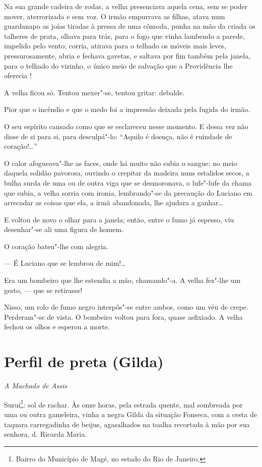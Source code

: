 Na sua grande cadeira de rodas, a velha presenciava aquela cena, sem se
poder mover, aterrorizada e sem voz. O irmão empurrava as filhas, atava
num guardanapo as joias tiradas à pressa de uma cômoda, punha na mão da
criada os talheres de prata, olhava para trás, para o fogo que vinha
lambendo a parede, impelido pelo vento; corria, atirava para o telhado
os móveis mais leves, pressurosamente, abria e fechava gavetas, e
saltava por fim também pela janela, para o telhado do vizinho, o único
meio de salvação que a Providência lhe oferecia !

A velha ficou só. Tentou mexer"-se, tentou gritar: debalde.

Pior que o incêndio e que o medo foi a impressão deixada pela fugida do
irmão.

O seu espírito cansado como que se esclareceu nesse momento. E dessa vez
não disse de si para si, para desculpá"-lo: ``Aquilo é doença, não é
ruindade de coração!\ldots{}''

O calor afogueava"-lhe as faces, onde há muito não subia o sangue; no
meio daquela solidão pavorosa, ouvindo o crepitar da madeira nuns
estalidos secos, a bulha surda de uma ou de outra viga que se
desmoronava, o lufe"-lufe da chama que subia, a velha sorria com ironia,
lembrando"-se da precaução do Luciano em arrecadar as coisas que ela, a
irmã abandonada, lhe ajudara a ganhar\ldots{}

E voltou de novo o olhar para a janela; então, entre o fumo já espesso,
viu desenhar"-se ali uma figura de homem.

O coração bateu"-lhe com alegria.

--- É Luciano que se lembrou de mim!\ldots{}

Era um bombeiro que lhe estendia a mão, chamando"-a. A velha fez"-lhe um
gesto, --- que se retirasse!

Nisso, um rolo de fumo negro interpôs"-se entre ambos, como um véu de
crepe. Perderam"-se de vista. O bombeiro voltou para fora, quase
asfixiado. A velha fechou os olhos e esperou a morte.

\chapter{Perfil de preta (Gilda)}

\hfill{}\emph{A Machado de Assis}

\bigskip

Suruí\footnote{Bairro do Município de Magé, no estado do Rio de Janeiro.}:
sol de rachar. Às onze horas, pela estrada quente, mal sombreada por uma
ou outra gameleira, vinha a negra Gilda da situação Fonseca, com a cesta
de taquara carregadinha de beijus, agasalhados na toalha recortada à mão
por sua senhora, d. Ricarda Maria.

